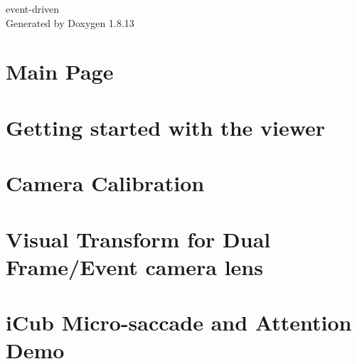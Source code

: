 \documentclass[twoside]{book}
\newcommand{\+}{\discretionary{\mbox{\scriptsize$\hookleftarrow$}}{}{}}
\newcommand{\clearemptydoublepage}{%
  \newpage{\pagestyle{empty}\cleardoublepage}%
}
\begin{document}
\hypersetup{pageanchor=false,
             bookmarksnumbered=true,
             pdfencoding=unicode
            }
\begin{titlepage}
\vspace*{7cm}
\begin{center}%
{\Large event-\/driven }\\
\vspace*{1cm}
{\large Generated by Doxygen 1.8.13}\\
\end{center}
\end{titlepage}
\clearemptydoublepage
{}
\tableofcontents
\clearemptydoublepage
{}
\hypersetup{pageanchor=true}

\chapter{Main Page}
\label{index}\hypertarget{index}{}
\chapter{Getting started with the viewer}
\label{md__mnt_c_Users_AGlover_Documents_projects_event-driven_documentation_1viewer}

\chapter{Camera Calibration}
\label{md__mnt_c_Users_AGlover_Documents_projects_event-driven_documentation_2calibration}

\chapter{Visual Transform for Dual Frame/\+Event camera lens}
\label{md__mnt_c_Users_AGlover_Documents_projects_event-driven_documentation_3a_8dualcam}

\chapter{i\+Cub Micro-\/saccade and Attention Demo}
\label{md__mnt_c_Users_AGlover_Documents_projects_event-driven_documentation_3b_8autosaccade}

\end{document}
